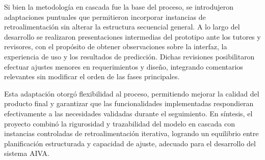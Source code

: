 Si bien la metodología en cascada fue la base del proceso, se introdujeron adaptaciones puntuales que permitieron incorporar instancias de retroalimentación sin alterar la estructura secuencial general. A lo largo del desarrollo se realizaron presentaciones intermedias del prototipo ante los tutores y revisores, con el propósito de obtener observaciones sobre la interfaz, la experiencia de uso y los resultados de predicción. Dichas revisiones posibilitaron efectuar ajustes menores en requerimientos y diseño, integrando comentarios relevantes sin modificar el orden de las fases principales. 

Esta adaptación otorgó flexibilidad al proceso, permitiendo mejorar la calidad del producto final y garantizar que las funcionalidades implementadas respondieran efectivamente a las necesidades validadas durante el seguimiento. En síntesis, el proyecto combinó la rigurosidad y trazabilidad del modelo en cascada con instancias controladas de retroalimentación iterativa, logrando un equilibrio entre planificación estructurada y capacidad de ajuste, adecuado para el desarrollo del sistema AIVA.


\vspace{1cm}

